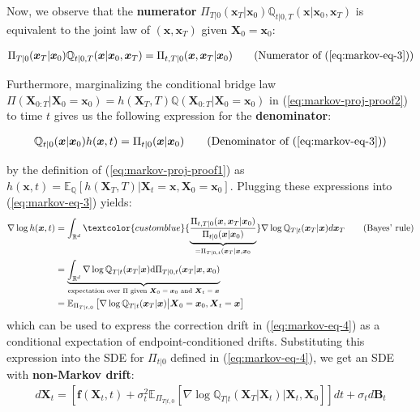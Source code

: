 \documentclass{article}
\newcommand{\bluetext}[1]{\textcolor{customblue}{#1}}
\begin{document}
Now, we observe that the \textbf{numerator} $\Pi_{T|0}(\boldsymbol{x}_T|\boldsymbol{x}_0)\mathbb{Q}_{t|0,T}(\boldsymbol{x}|\boldsymbol{x}_0,\boldsymbol{x}_T)$ is equivalent to the joint law of $(\boldsymbol{x}, \boldsymbol{x}_T)$ given $\boldsymbol{X}_0=\boldsymbol{x}_0$:
\begin{small}
\begin{align}
    \Pi_{T|0}(\boldsymbol{x}_T|\boldsymbol{x}_0)\mathbb{Q}_{t|0,T}(\boldsymbol{x}|\boldsymbol{x}_0,\boldsymbol{x}_T)=\Pi_{t,T|0}(\boldsymbol{x}, \boldsymbol{x}_T|\boldsymbol{x}_0)\tag{Numerator of (\ref{eq:markov-eq-3})}
\end{align}
\end{small}
Furthermore, marginalizing the conditional bridge law $\Pi(\boldsymbol{X}_{0:T}  |\boldsymbol{X}_0=\boldsymbol{x}_0)=h(\boldsymbol{X}_T,T)\mathbb{Q}(\boldsymbol{X}_{0:T} |\boldsymbol{X}_0=\boldsymbol{x}_0)$ in (\ref{eq:markov-proj-proof2}) to time $t$ gives us the following expression for the \textbf{denominator}:
\begin{small}
\begin{align}
    \mathbb{Q}_{t|0}(\boldsymbol{x}|\boldsymbol{x}_0)h(\boldsymbol{x},t)=\Pi_{t|0}(\boldsymbol{x}|\boldsymbol{x}_0)\tag{Denominator of (\ref{eq:markov-eq-3})}
\end{align}
\end{small}
by the definition of (\ref{eq:markov-proj-proof1}) as $h(\boldsymbol{x},t)=\mathbb{E}_{\mathbb{Q}}[h(\boldsymbol{X}_T,T)|\boldsymbol{X}_t=\boldsymbol{x},\boldsymbol{X}_0=\boldsymbol{x}_0]$. Plugging these expressions into (\ref{eq:markov-eq-3}) yields:
\begin{align}
    \nabla \log h(\boldsymbol{x},t)&=\int_{\mathbb{R}^d}\bluetext{\underbrace{\frac{\Pi_{t,T|0}(\boldsymbol{x}, \boldsymbol{x}_T|\boldsymbol{x}_0)}{\Pi_{t|0}(\boldsymbol{x}|\boldsymbol{x}_0)}}_{=\Pi_{T|0,t}(\boldsymbol{x}_T|\boldsymbol{x}, \boldsymbol{x}_0}}\nabla \log \mathbb{Q}_{T|t}(\boldsymbol{x}_T|\boldsymbol{x})d\boldsymbol{x}_T\tag{Bayes' rule}\\
    &=\underbrace{\int_{\mathbb{R}^d}\nabla \log \mathbb{Q}_{T|t}(\boldsymbol{x}_T|\boldsymbol{x})\mathrm{d}\Pi_{T|0,t}(\boldsymbol{x}_T|\boldsymbol{x}, \boldsymbol{x}_0)}_{\text{expectation over $\Pi$ given $\boldsymbol{X}_0=\boldsymbol{x}_0$ and $\boldsymbol{X}_t=\boldsymbol{x}$}}\nonumber\\
    &=\mathbb{E}_{\Pi_{T|t,0}}\left[\nabla \log \mathbb{Q}_{T|t}(\boldsymbol{x}_T|\boldsymbol{x})\big|\boldsymbol{X}_0=\boldsymbol{x}_0, \boldsymbol{X}_t=\boldsymbol{x}\right]
\end{align}
which can be used to express the correction drift in (\ref{eq:markov-eq-4}) as a conditional expectation of endpoint-conditioned drifts. Substituting this expression into the SDE for $\Pi_{t|0}$ defined in (\ref{eq:markov-eq-4}), we get an SDE with \textbf{non-Markov drift}:
\begin{align}
    d\boldsymbol{X}_t=\left[\boldsymbol{f}(\boldsymbol{X}_t,t)+\sigma_t^2\mathbb{E}_{\Pi_{T|t,0}}\left[\nabla \log \mathbb{Q}_{T|t}(\boldsymbol{X}_T|\boldsymbol{X}_t)\big|\boldsymbol{X}_t, \boldsymbol{X}_0\right]\right]dt +\sigma_td\boldsymbol{B}_t
\end{align}
\end{document}
